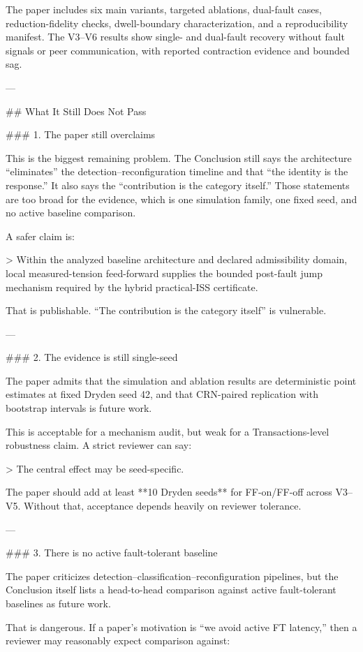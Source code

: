 The paper includes six main variants, targeted ablations, dual-fault cases, reduction-fidelity checks, dwell-boundary characterization, and a reproducibility manifest. The V3–V6 results show single- and dual-fault recovery without fault signals or peer communication, with reported contraction evidence and bounded sag.

---

## What It Still Does Not Pass

### 1. The paper still overclaims

This is the biggest remaining problem. The Conclusion still says the architecture “eliminates” the detection–reconfiguration timeline and that “the identity is the response.” It also says the “contribution is the category itself.” Those statements are too broad for the evidence, which is one simulation family, one fixed seed, and no active baseline comparison.

A safer claim is:

> Within the analyzed baseline architecture and declared admissibility domain, local measured-tension feed-forward supplies the bounded post-fault jump mechanism required by the hybrid practical-ISS certificate.

That is publishable. “The contribution is the category itself” is vulnerable.

---

### 2. The evidence is still single-seed

The paper admits that the simulation and ablation results are deterministic point estimates at fixed Dryden seed 42, and that CRN-paired replication with bootstrap intervals is future work.

This is acceptable for a mechanism audit, but weak for a Transactions-level robustness claim. A strict reviewer can say:

> The central effect may be seed-specific.

The paper should add at least **10 Dryden seeds** for FF-on/FF-off across V3–V5. Without that, acceptance depends heavily on reviewer tolerance.

---

### 3. There is no active fault-tolerant baseline

The paper criticizes detection–classification–reconfiguration pipelines, but the Conclusion itself lists a head-to-head comparison against active fault-tolerant baselines as future work.

That is dangerous. If a paper’s motivation is “we avoid active FT latency,” then a reviewer may reasonably expect comparison against:

